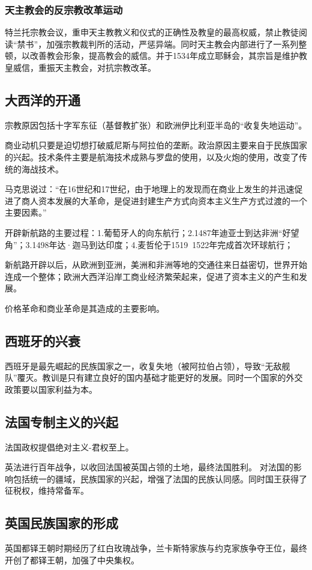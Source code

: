 \subsubsection{天主教会的反宗教改革运动}
特兰托宗教会议，重申天主教教义和仪式的正确性及教皇的最高权威，禁止教徒阅读“禁书”，加强宗教裁判所的活动，严惩异端。同时天主教会内部进行了一系列整顿，以改善教会形象，提高教会的威信。并于1534年成立耶稣会，其宗旨是维护教皇威信，重振天主教会，对抗宗教改革。

\subsection{大西洋的开通}
宗教原因包括十字军东征（基督教扩张）和欧洲伊比利亚半岛的“收复失地运动”。

商业动机只要是迫切想打破威尼斯与阿拉伯的垄断。政治原因主要来自于民族国家的兴起。技术条件主要是航海技术成熟与罗盘的使用，以及火炮的使用，改变了传统的海战技术。

马克思说过：“在16世纪和17世纪，由于地理上的发现而在商业上发生的并迅速促进了商人资本发展的大革命，是促进封建生产方式向资本主义生产方式过渡的一个主要因素。”

开辟新航路的主要过程：1.葡萄牙人的向东航行；2.1487年迪亚士到达非洲“好望角”；3.1498年达·迦马到达印度；4.麦哲伦于1519~1522年完成首次环球航行；

新航路开辟以后，从欧洲到亚洲，美洲和非洲等地的交通往来日益密切，世界开始连成一个整体；欧洲大西洋沿岸工商业经济繁荣起来，促进了资本主义的产生和发展。

价格革命和商业革命是其造成的主要影响。

\subsection{西班牙的兴衰}
西班牙是最先崛起的民族国家之一，收复失地（被阿拉伯占领），导致“无敌舰队”覆灭。教训是只有建立良好的国内基础才能更好的发展。同时一个国家的外交政策要以国家利益为本。

\subsection{法国专制主义的兴起}
法国政权提倡绝对主义-君权至上。

英法进行百年战争，以收回法国被英国占领的土地，最终法国胜利。
对法国的影响包括统一的疆域，民族国家的兴起，增强了法国的民族认同感。同时国王获得了征税权，维持常备军。

\subsection{英国民族国家的形成}
英国都铎王朝时期经历了红白玫瑰战争，兰卡斯特家族与约克家族争夺王位，最终开创了都铎王朝，加强了中央集权。

